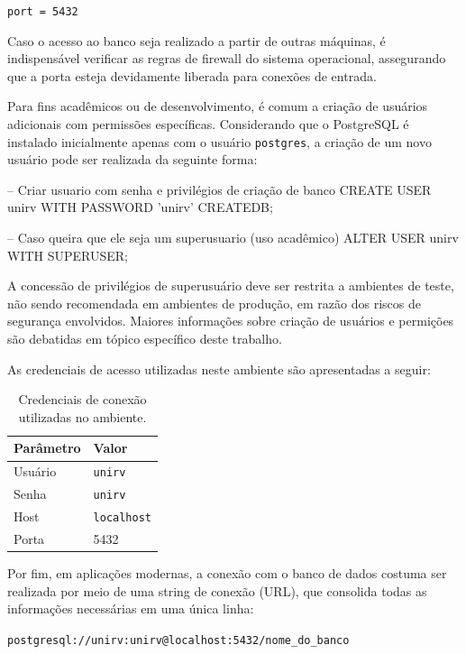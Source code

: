 \begin{center}
\texttt{port = 5432}
\end{center}

Caso o acesso ao banco seja realizado a partir de outras máquinas, é indispensável verificar as regras de firewall do sistema operacional, assegurando que a porta esteja devidamente liberada para conexões de entrada.

Para fins acadêmicos ou de desenvolvimento, é comum a criação de usuários adicionais com permissões específicas. Considerando que o PostgreSQL é instalado inicialmente apenas com o usuário \texttt{postgres}, a criação de um novo usuário pode ser realizada da seguinte forma:

\begin{sqlcode}
-- Criar usuario com senha e privilégios de criação de banco
CREATE USER unirv WITH PASSWORD 'unirv' CREATEDB;

-- Caso queira que ele seja um superusuario (uso acadêmico)
ALTER USER unirv WITH SUPERUSER;
\end{sqlcode}

A concessão de privilégios de superusuário deve ser restrita a ambientes de teste, não sendo recomendada em ambientes de produção, em razão dos riscos de segurança envolvidos. Maiores informações sobre criação de usuários e permições são debatidas em tópico específico deste trabalho.

As credenciais de acesso utilizadas neste ambiente são apresentadas a seguir:

\begin{table}[h!]
\centering
\begin{tabular}{|l|l|}
\hline
\textbf{Parâmetro} & \textbf{Valor} \\ \hline
Usuário            & \texttt{unirv} \\ \hline
Senha              & \texttt{unirv} \\ \hline
Host               & \texttt{localhost} \\ \hline
Porta              & 5432 \\ \hline
\end{tabular}
\caption{Credenciais de conexão utilizadas no ambiente.}
\end{table}

Por fim, em aplicações modernas, a conexão com o banco de dados costuma ser realizada por meio de uma string de conexão (URL), que consolida todas as informações necessárias em uma única linha:

\begin{center}
\texttt{postgresql://unirv:unirv@localhost:5432/nome\_do\_banco}
\end{center}

